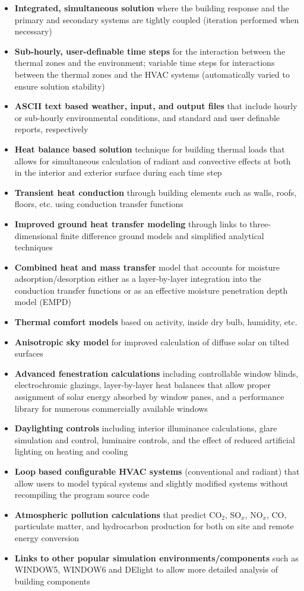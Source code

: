 \begin{itemize}
\item
  \textbf{Integrated, simultaneous solution} where the building response and the primary and secondary systems are tightly coupled (iteration performed when necessary)
\item
  \textbf{Sub-hourly, user-definable time steps} for the interaction between the thermal zones and the environment; variable time steps for interactions between the thermal zones and the HVAC systems (automatically varied to ensure solution stability)
\item
  \textbf{ASCII text based weather, input, and output files} that include hourly or sub-hourly environmental conditions, and standard and user definable reports, respectively
\item
  \textbf{Heat balance based solution} technique for building thermal loads that allows for simultaneous calculation of radiant and convective effects at both in the interior and exterior surface during each time step
\item
  \textbf{Transient heat conduction} through building elements such as walls, roofs, floors, etc. using conduction transfer functions
\item
  \textbf{Improved ground heat transfer modeling} through links to three-dimensional finite difference ground models and simplified analytical techniques
\item
  \textbf{Combined heat and mass transfer} model that accounts for moisture adsorption/desorption either as a layer-by-layer integration into the conduction transfer functions or as an effective moisture penetration depth model (EMPD)
\item
  \textbf{Thermal comfort models} based on activity, inside dry bulb, humidity, etc.
\item
  \textbf{Anisotropic sky model} for improved calculation of diffuse solar on tilted surfaces
\item
  \textbf{Advanced fenestration calculations} including controllable window blinds, electrochromic glazings, layer-by-layer heat balances that allow proper assignment of solar energy absorbed by window panes, and a performance library for numerous commercially available windows
\item
  \textbf{Daylighting controls} including interior illuminance calculations, glare simulation and control, luminaire controls, and the effect of reduced artificial lighting on heating and cooling
\item
  \textbf{Loop} \textbf{based configurable HVAC systems} (conventional and radiant) that allow users to model typical systems and slightly modified systems without recompiling the program source code
\item
  \textbf{Atmospheric pollution calculations} that predict CO\(_{2}\), SO\(_{x}\), NO\(_{x}\), CO, particulate matter, and hydrocarbon production for both on site and remote energy conversion
\item
  \textbf{Links to other popular simulation environments/components} such as WINDOW5, WINDOW6 and DElight to allow more detailed analysis of building components
\end{itemize}

